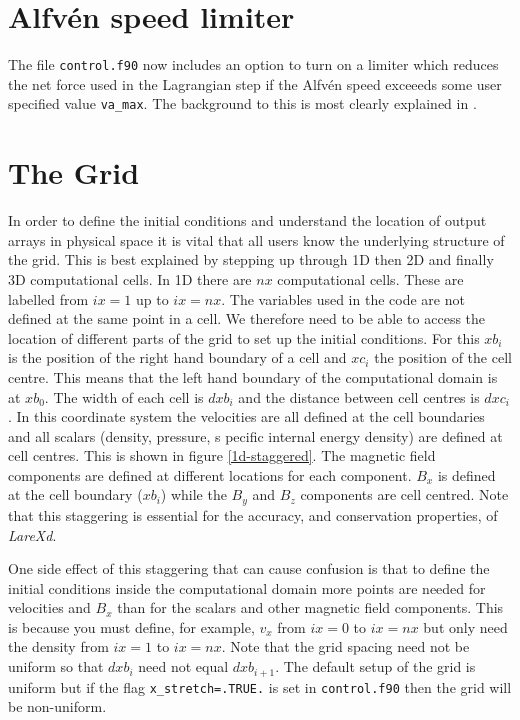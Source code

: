 \documentclass[11pt]{article}
\begin{document}
\section{Alfv\'en speed limiter}
The file \texttt{control.f90} now includes an option to turn on a limiter which reduces the net force used
in the Lagrangian step if the Alfv\'en speed exceeeds some user specified value \texttt{va\_max}. The background
to this is most clearly explained in \cite{gombosi:2002}.


\section{The Grid}
In order to define the initial conditions and understand the location of output arrays in physical space it is vital 
that all users know the underlying structure of the grid. This is best explained by stepping up through 1D then 2D and 
finally 3D computational cells. In 1D there are $nx$ computational cells. These are labelled from $ix=1$ up to $ix=nx$. 
The variables used in the code are not defined at the same point in a cell. We therefore need to be able to access the 
location of different parts of the grid to set up the initial conditions. For this $xb_i$ is the position of the right 
hand boundary of a cell and $xc_i$ the position of the cell centre. This means that the left hand boundary of the 
computational domain is at $xb_0$. The width of each cell is $dxb_i$ and the distance between cell centres is $dxc_i$. 
In this coordinate system the velocities are all defined at the cell boundaries and all scalars (density, pressure, s
pecific internal energy density) are defined at cell centres. This is shown in figure \ref{1d-staggered}. The magnetic 
field components are defined at different locations for each component. $B_x$ is defined at the cell boundary ($xb_i$) 
while the $B_y$ and $B_z$ components are cell centred. Note that this staggering is essential for the accuracy, and 
conservation properties, of {\it LareXd}.

One side effect of this staggering that can cause confusion is that to define the initial conditions inside the 
computational domain more points are needed for velocities and $B_x$ than for the scalars and other magnetic field 
components. This is because you must define, for example, $v_x$ from $ix=0$ to $ix=nx$ but only need the density 
from $ix=1$ to $ix=nx$. Note that the grid spacing need not be uniform so that $dxb_i$ need not equal $dxb_{i+1}$. 
The default setup of the grid is uniform but if the flag \texttt{x\_stretch=.TRUE.} is set in \texttt{control.f90} 
then the grid will be non-uniform.
\end{document}

